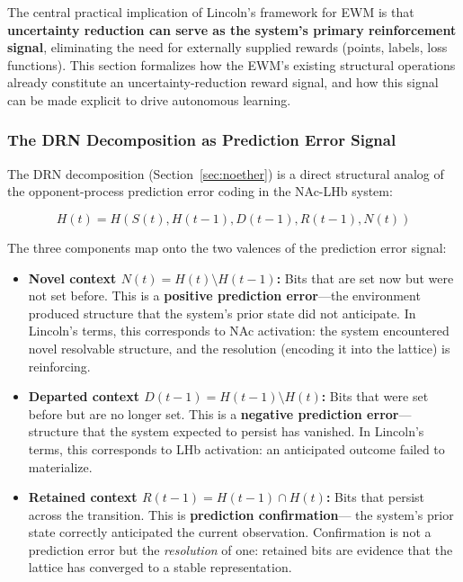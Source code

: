 \documentclass[11pt,a4paper]{article}
\theoremstyle{remark}
\begin{document}
The central practical implication of Lincoln's framework for EWM is that
\textbf{uncertainty reduction can serve as the system's primary reinforcement
signal}, eliminating the need for externally supplied rewards (points, labels,
loss functions). This section formalizes how the EWM's existing structural
operations already constitute an uncertainty-reduction reward signal, and how
this signal can be made explicit to drive autonomous learning.

\subsubsection{The DRN Decomposition as Prediction Error Signal}

The DRN decomposition (Section~\ref{sec:noether}) is a direct structural analog
of the opponent-process prediction error coding in the NAc-LHb system:

\begin{equation}
  H(t) = H(S(t), H(t-1), D(t-1), R(t-1), N(t))
\end{equation}

The three components map onto the two valences of the prediction error signal:
\begin{itemize}[leftmargin=*,nosep]
  \item \textbf{Novel context $N(t) = H(t) \setminus H(t-1)$:} Bits that are
    set now but were not set before. This is a \textbf{positive prediction
    error}---the environment produced structure that the system's prior state
    did not anticipate. In Lincoln's terms, this corresponds to NAc activation:
    the system encountered novel resolvable structure, and the resolution
    (encoding it into the lattice) is reinforcing.
  \item \textbf{Departed context $D(t-1) = H(t-1) \setminus H(t)$:} Bits
    that were set before but are no longer set. This is a \textbf{negative
    prediction error}---structure that the system expected to persist has
    vanished. In Lincoln's terms, this corresponds to LHb activation: an
    anticipated outcome failed to materialize.
  \item \textbf{Retained context $R(t-1) = H(t-1) \cap H(t)$:} Bits that
    persist across the transition. This is \textbf{prediction confirmation}---
    the system's prior state correctly anticipated the current observation.
    Confirmation is not a prediction error but the \textit{resolution} of
    one: retained bits are evidence that the lattice has converged to a stable
    representation.
\end{itemize}
\end{document}

